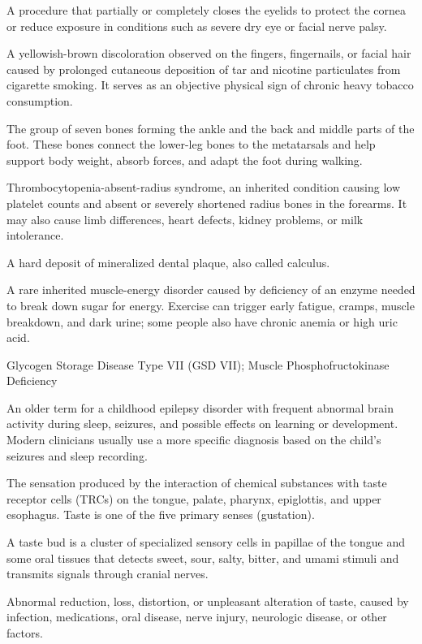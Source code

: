  A procedure that partially or completely closes the eyelids to protect the cornea or reduce exposure in conditions such as severe dry eye or facial nerve palsy.

 A yellowish-brown discoloration observed on the fingers, fingernails, or facial hair caused by prolonged cutaneous deposition of tar and nicotine particulates from cigarette smoking. It serves as an objective physical sign of chronic heavy tobacco consumption.

 The group of seven bones forming the ankle and the back and middle parts of the foot. These bones connect the lower-leg bones to the metatarsals and help support body weight, absorb forces, and adapt the foot during walking.

 Thrombocytopenia-absent-radius syndrome, an inherited condition causing low platelet counts and absent or severely shortened radius bones in the forearms. It may also cause limb differences, heart defects, kidney problems, or milk intolerance.

 A hard deposit of mineralized dental plaque, also called calculus.

 A rare inherited muscle-energy disorder caused by deficiency of an enzyme needed to break down sugar for energy. Exercise can trigger early fatigue, cramps, muscle breakdown, and dark urine; some people also have chronic anemia or high uric acid.

\synonyms
Glycogen Storage Disease Type VII (GSD VII); Muscle Phosphofructokinase Deficiency

 An older term for a childhood epilepsy disorder with frequent abnormal brain activity during sleep, seizures, and possible effects on learning or development. Modern clinicians usually use a more specific diagnosis based on the child’s seizures and sleep recording.

 The sensation produced by the interaction of chemical substances with taste receptor
cells (TRCs) on the tongue, palate, pharynx, epiglottis, and upper esophagus. Taste is
one of the five primary senses (gustation).

 A taste bud is a cluster of specialized sensory cells in papillae of the tongue and some oral tissues that detects sweet, sour, salty, bitter, and umami stimuli and transmits signals through cranial nerves.

 Abnormal reduction, loss, distortion, or unpleasant alteration of taste, caused by infection, medications, oral disease, nerve injury, neurologic disease, or other factors.

